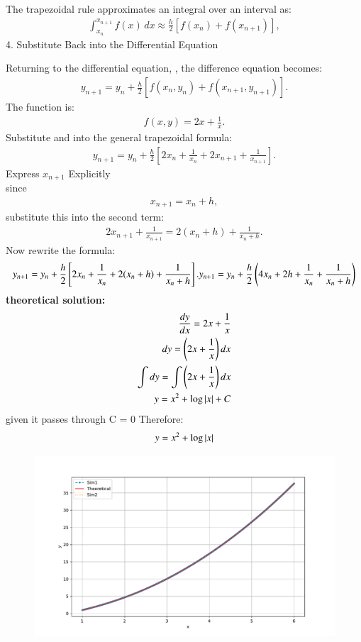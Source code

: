\documentclass[journal]{IEEEtran}
\begin{document}
The trapezoidal rule approximates an integral over an interval  as:
\begin{align}
\int_{x_n}^{x_{n+1}} f(x) \, dx \approx \frac{h}{2} \left[ f(x_n) + f(x_{n+1}) \right],
\end{align}
4. Substitute Back into the Differential Equation

Returning to the differential equation, , the difference equation becomes:
\begin{align}
y_{n+1} = y_n + \frac{h}{2} \left[ f(x_n, y_n) + f(x_{n+1}, y_{n+1}) \right].
\end{align}
The function  is:
\begin{align}
f(x, y) =  2x + \frac{1}{x}.
\end{align}
Substitute  and  into the general trapezoidal formula:
\begin{align}
y_{n+1} = y_n + \frac{h}{2} \left[2x_n + \frac{1}{x_n} + 2x_{n+1} +\frac{1}{x_{n+1}} \right].
\end{align}
 Express $x_{n+1}$ Explicitly \\
 since 
 \begin{align}
     x_{n+1} = x_n + h,
 \end{align}
 substitute this into the second term: 
 \begin{align}
     2x_{n+1} + \frac{1}{x_{n+1}} = 2(x_n + h) + \frac{1}{x_n + h}.
 \end{align}
 Now rewrite the formula:
 \begin{align}
     y_{n+1} = y_n + \frac{h}{2} \left[2x_n +  \frac{1}{x_n} + 2(x_n + h) + \frac{1}{x_n + h} \right].
     y_{n+1} = y_n + \frac{h}{2} \left(4x_n + 2h + \frac{1}{x_n}+\frac{1}{x_n + h}\right)
 \end{align}
 \textbf{theoretical solution:}
 \begin{align}
    \frac{dy}{dx} = 2x + \frac{1}{x}\\
    dy = \left(2x+\frac{1}{x}\right)dx\\
    \int dy = \int\left(2x+\frac{1}{x}\right)dx\\
    y = x^2 + \log{\left\vert x\right\vert} + C
\end{align}
given it passes through  C = 0
Therefore: 
\begin{align}
    y = x^2 + \log{\left\vert x\right\vert}
\end{align}
 \begin{figure}[h!]
   \centering
   \includegraphics[width=\columnwidth]{figs/fig.pdf}
\end{figure}
\end{document}
